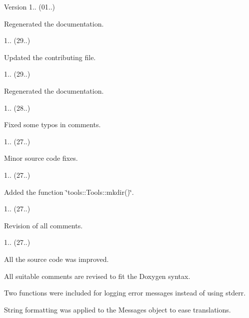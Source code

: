 \begin{DoxyVersion}{Version}
1.. (01..)
\begin{DoxyItemize}
\item Regenerated the documentation. 
\end{DoxyItemize}

1.. (29..)
\begin{DoxyItemize}
\item Updated the contributing file. 
\end{DoxyItemize}

1.. (29..)
\begin{DoxyItemize}
\item Regenerated the documentation. 
\end{DoxyItemize}

1.. (28..)
\begin{DoxyItemize}
\item Fixed some typos in comments. 
\end{DoxyItemize}

1.. (27..)
\begin{DoxyItemize}
\item Minor source code fixes. 
\end{DoxyItemize}

1.. (27..)
\begin{DoxyItemize}
\item Added the function \char`\"{}tools\+::\+Tools\+::mkdir()\char`\"{}. 
\end{DoxyItemize}

1.. (27..)
\begin{DoxyItemize}
\item Revision of all comments. 
\end{DoxyItemize}

1.. (27..)
\begin{DoxyItemize}
\item All the source code was improved.
\item All suitable comments are revised to fit the Doxygen syntax.
\item Two functions were included for logging error messages instead of using stderr.
\item String formatting was applied to the Messages object to ease translations. 
\end{DoxyItemize}
\end{DoxyVersion}
